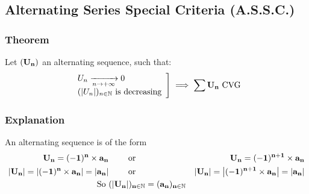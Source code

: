 \documentclass[notitlepage]{math}
\begin{document}
\subsection{Alternating Series Special Criteria (A.S.S.C.)}
\subsubsection{Theorem}
Let $\bf (U_n)$ an alternating sequence, such that:
\[\bf \left. \begin{array}{l}
    U_n \xrightarrow[n \to +\infty]{} 0\\
    (\left\lvert U_n \right\rvert )_{n \in \mathbb{N}} \text{ is decreasing}
\end{array} \right] \implies \sum U_n \text{ CVG}\]
\subsubsection{Explanation}
An alternating sequence is of the form 
\begin{align*}
    \bf U_n = (-1)^n \times a_n & \qquad \text{ or } & \bf U_n = (-1)^{n+1} \times a_n\\
\bf \left\lvert U_n \right\rvert = \left\lvert (-1)^n \times a_n \right\rvert = \left\lvert a_n \right\rvert & \qquad \text{ or } & \bf \left\lvert U_{n} \right\rvert = \left\lvert (-1)^{n+1} \times a_{n} \right\rvert = \left\lvert a_{n} \right\rvert\\
\text{So }& \bf (\left\lvert U_n \right\rvert )_{n \in \mathbb{N}} = (a_n)_{n \in \mathbb{N}}&\\
\end{align*}
\end{document}
